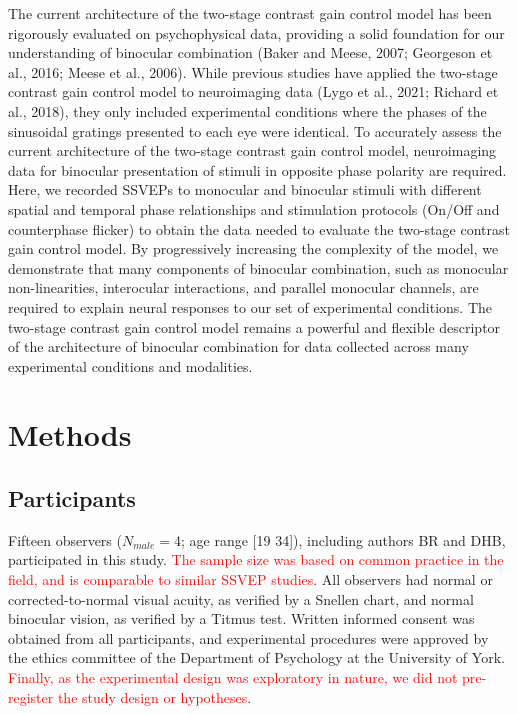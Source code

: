 \documentclass[review,
  12pt,
]{elsarticle}
\begin{document}
The current architecture of the two-stage contrast gain control model
has been rigorously evaluated on psychophysical data, providing a solid
foundation for our understanding of binocular combination (Baker and
Meese, 2007; Georgeson et al., 2016; Meese et al., 2006). While previous
studies have applied the two-stage contrast gain control model to
neuroimaging data (Lygo et al., 2021; Richard et al., 2018), they only
included experimental conditions where the phases of the sinusoidal
gratings presented to each eye were identical. To accurately assess the
current architecture of the two-stage contrast gain control model,
neuroimaging data for binocular presentation of stimuli in opposite
phase polarity are required. Here, we recorded SSVEPs to monocular and
binocular stimuli with different spatial and temporal phase
relationships and stimulation protocols (On/Off and counterphase
flicker) to obtain the data needed to evaluate the two-stage contrast
gain control model. By progressively increasing the complexity of the
model, we demonstrate that many components of binocular combination,
such as monocular non-linearities, interocular interactions, and
parallel monocular channels, are required to explain neural responses to
our set of experimental conditions. The two-stage contrast gain control
model remains a powerful and flexible descriptor of the architecture of
binocular combination for data collected across many experimental
conditions and modalities.

\section{Methods}\label{methods}

\subsection{Participants}\label{participants}

Fifteen observers (\(N_{male} = 4\); age range {[}19 34{]}), including
authors BR and DHB, participated in this study. \textcolor{red}{The sample size
was based on common practice in the field, and is comparable to similar
SSVEP studies}. All observers had normal or corrected-to-normal visual
acuity, as verified by a Snellen chart, and normal binocular vision, as
verified by a Titmus test. Written informed consent was obtained from
all participants, and experimental procedures were approved by the
ethics committee of the Department of Psychology at the University of
York. \textcolor{red}{Finally, as the experimental design was exploratory in
nature, we did not pre-register the study design or hypotheses}.
\end{document}
